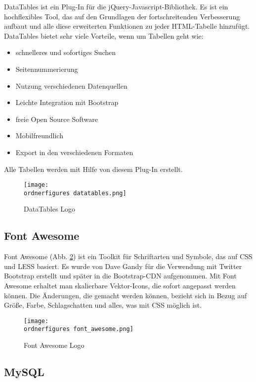DataTables ist ein Plug-In f\"{u}r die jQuery-Javascript-Bibliothek. Es ist ein hochflexibles Tool, das auf den Grundlagen der fortschreitenden Verbesserung aufbaut und alle diese erweiterten Funktionen zu jeder HTML-Tabelle hinzuf\"{u}gt. DataTables bietet sehr viele Vorteile, wenn um Tabellen geht wie: 
\begin{itemize}
	\item schnelleres und sofortiges Suchen
	\item Seitennummerierung
	\item Nutzung verschiedenen Datenquellen
	\item Leichte Integration mit Bootstrap
	\item freie Open Source Software 
	\item Mobilfreundlich
	\item Export in den verschiedenen Formaten
\end{itemize}

Alle Tabellen werden mit Hilfe von diesem Plug-In erstellt. \cite{40_datatables}

\begin{figure}[H]
	\centering
	\texttt{[image: \\ordnerfigures datatables.png]}
	\caption{DataTables Logo \cite{40_datatables_img}}
	\label{fi:datatables}
\end{figure}


\subsection{Font Awesome}
Font Awesome (Abb. \ref{fi:fontawesome}) ist ein Toolkit für Schriftarten und Symbole, das auf CSS und LESS basiert. Es wurde von Dave Gandy für die Verwendung mit Twitter Bootstrap erstellt und später in die Bootstrap-CDN aufgenommen. Mit Font Awesome erhaltet man skalierbare Vektor-Icons, die sofort angepasst werden können. Die Änderungen, die gemacht werden können, bezieht sich in Bezug auf Größe, Farbe, Schlagschatten und alles, was mit CSS möglich ist.

\begin{figure}[H]
	\centering
	\texttt{[image: \\ordnerfigures font\_awesome.png]}
	\caption{Font Awesome Logo \cite{40_font_awesome_img}}
	\label{fi:fontawesome}
\end{figure}


\subsection{MySQL}

